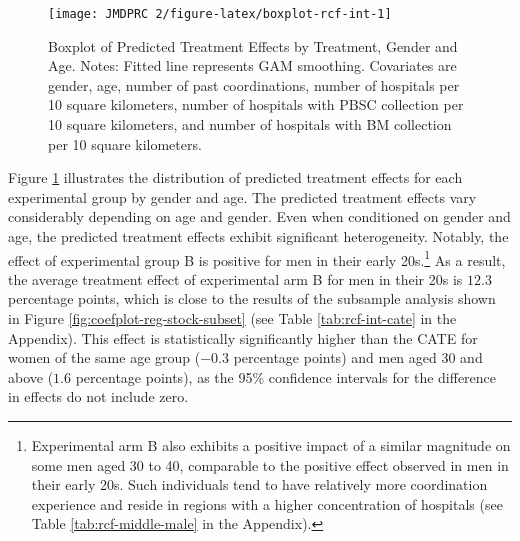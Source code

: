 \documentclass[
  11pt,
  a4paper
]{article}
\begin{document}
\begin{figure}[t]
\texttt{[image: JMDPRC~2/figure-latex/boxplot-rcf-int-1]} \caption{Boxplot of Predicted Treatment Effects by Treatment, Gender and Age. Notes: Fitted line represents GAM smoothing. Covariates are gender, age, number of past coordinations, number of hospitals per 10 square kilometers, number of hospitals with PBSC collection per 10 square kilometers, and number of hospitals with BM collection per 10 square kilometers.}\label{fig:boxplot-rcf-int}
\end{figure}

Figure \ref{fig:boxplot-rcf-int} illustrates the distribution of predicted treatment effects for each experimental group by gender and age. The predicted treatment effects vary considerably depending on age and gender. Even when conditioned on gender and age, the predicted treatment effects exhibit significant heterogeneity. Notably, the effect of experimental group B is positive for men in their early 20s.\footnote{Experimental arm B also exhibits a positive impact of a similar magnitude on some men aged 30 to 40, comparable to the positive effect observed in men in their early 20s. Such individuals tend to have relatively more coordination experience and reside in regions with a higher concentration of hospitals (see Table \ref{tab:rcf-middle-male} in the Appendix).} As a result, the average treatment effect of experimental arm B for men in their 20s is \(12.3\) percentage points, which is close to the results of the subsample analysis shown in Figure \ref{fig:coefplot-reg-stock-subset} (see Table \ref{tab:rcf-int-cate} in the Appendix). This effect is statistically significantly higher than the CATE for women of the same age group (\(-0.3\) percentage points) and men aged 30 and above (\(1.6\) percentage points), as the 95\% confidence intervals for the difference in effects do not include zero.
\end{document}
